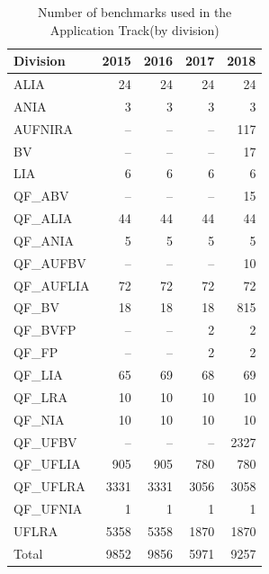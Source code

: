 \documentclass[dvipsnames,table,twoside,11pt]{article}
\newcommand{\apptrack}{Application Track\xspace}
\begin{document}
\begin{table}
  \caption{Number of benchmarks used in the \apptrack (by division)}
  \label{table:benchmarks-application-track}
  \centering
  \begin{tabular}{lrrrr}
    \toprule
    Division & \multicolumn{1}{c}{2015} & \multicolumn{1}{c}{2016} & \multicolumn{1}{c}{2017} & \multicolumn{1}{c}{2018} \\
    \midrule
    ALIA       &   24 &   24 &   24 &   24 \\
    ANIA       &    3 &    3 &    3 &    3 \\
    AUFNIRA    &   -- &   -- &   -- &  117 \\
    BV         &   -- &   -- &   -- &   17 \\
    LIA        &    6 &    6 &    6 &    6 \\
    QF\_ABV    &   -- &   -- &   -- &   15 \\
    QF\_ALIA   &   44 &   44 &   44 &   44 \\
    QF\_ANIA   &    5 &    5 &    5 &    5 \\
    QF\_AUFBV  &   -- &   -- &   -- &   10 \\
    QF\_AUFLIA &   72 &   72 &   72 &   72 \\
    QF\_BV     &   18 &   18 &   18 &  815 \\
    QF\_BVFP   &   -- &   -- &    2 &    2 \\
    QF\_FP     &   -- &   -- &    2 &    2 \\
    QF\_LIA    &   65 &   69 &   68 &   69 \\
    QF\_LRA    &   10 &   10 &   10 &   10 \\
    QF\_NIA    &   10 &   10 &   10 &   10 \\
    QF\_UFBV   &   -- &   -- &   -- & 2327 \\
    QF\_UFLIA  &  905 &  905 &  780 &  780 \\
    QF\_UFLRA  & 3331 & 3331 & 3056 & 3058 \\
    QF\_UFNIA  &    1 &    1 &    1 &    1 \\
    UFLRA      & 5358 & 5358 & 1870 & 1870 \\
    \midrule
    Total      & 9852 & 9856 & 5971 & 9257 \\
    \bottomrule
  \end{tabular}
\end{table}
\end{document}
